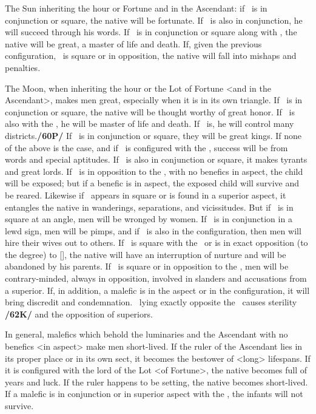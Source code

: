  The Sun inheriting the hour or Fortune and in the Ascendant: if \Jupiter\, is in conjunction or square, the native will be fortunate. If \Mercury\, is also in conjunction, he will succeed through his words. If \Mars\, is in conjunction or square along with \Jupiter, the native will be great, a master of life and death. If, given the previous configuration, \Saturn\, is square or in opposition, the native will fall into mishaps and penalties.

 The Moon, when inheriting the hour or the Lot of Fortune <and in the Ascendant>, makes men great, especially when it is in its own triangle. If \Venus\, is in conjunction or square, the native will be thought worthy of great honor. If \Mars\, is also with the \Moon, he will be master of life and death. If \Saturn\, is, he will control many districts.\textbf{/60P/} If \Jupiter\, is in conjunction or square, they will be great kings. If none of the above is the case, and if \Mercury\, is configured with the \Moon, success will be from words and special aptitudes. If \Mars\, is also in conjunction or square, it makes tyrants and great lords. If \Mars\, is in opposition to the \Moon, with no benefics in aspect, the child will be exposed; but if a benefic is in aspect, the exposed child will survive and be reared. Likewise if \Mars\, appears in square or is found in a superior aspect, it entangles the native in wanderings, separations, and vicissitudes. But if \Venus\, is in square at an angle, men will be wronged by women. If \Saturn\, is in conjunction in a lewd sign, men will be pimps, and if \Mars\, is also in the configuration, then men will hire their wives out to others. If \Saturn\, is square with the \Moon\, or is in \mned exact opposition (to the degree) to [\Saturn], the native will have an interruption of nurture and will be abandoned by his parents. If \Mercury\, is square or in opposition to the \Moon, men will be contrary-minded, always in opposition, involved in slanders and accusations from a superior. If, in addition, a malefic is in the aspect or in the configuration, it will bring discredit and condemnation. \Jupiter\, lying \mned exactly opposite the \Moon\, causes sterility \textbf{/62K/} and the opposition of superiors.

\mndl[0.2cm]
In general, malefics which behold the luminaries and the Ascendant with no benefics <in aspect> make men short-lived. If the ruler of the Ascendant lies in its proper place or in its own sect, it becomes the bestower of <long> lifespans. If it is configured with the lord of the Lot <of Fortune>, the native becomes full of years and luck. If the ruler happens to be setting, the native becomes short-lived. If a malefic is in conjunction or in superior aspect with the \Moon, the infants will not survive.

\newpage